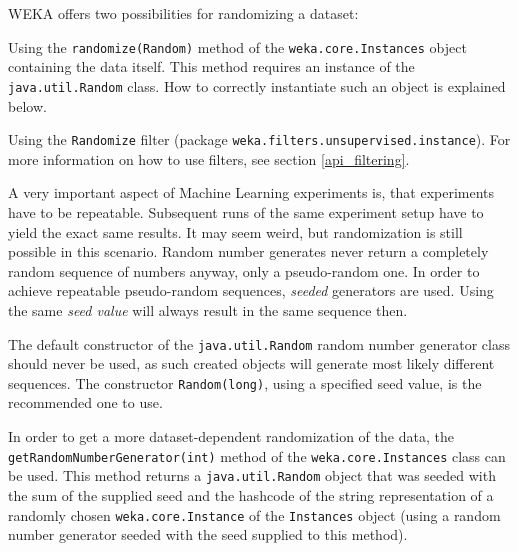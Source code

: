 WEKA offers two possibilities for randomizing a dataset:
\begin{tight_itemize}
	\item Using the \texttt{randomize(Random)} method of the
\texttt{weka.core.Instances} object containing the data itself. This method
requires an instance of the \texttt{java.util.Random} class. How to correctly
instantiate such an object is explained below.
	\item Using the \texttt{Randomize} filter (package
\texttt{weka.filters.unsupervised.instance}). For more information on how to
use filters, see section \ref{api_filtering}.
\end{tight_itemize}
A very important aspect of Machine Learning experiments is, that experiments
have to be repeatable. Subsequent runs of the same experiment setup have to
yield the exact same results. It may seem weird, but randomization is still
possible in this scenario. Random number generates never return a completely
random sequence of numbers anyway, only a pseudo-random one. In order to
achieve repeatable pseudo-random sequences, \textit{seeded} generators are
used. Using the same \textit{seed value} will always result in the same
sequence then.

The default constructor of the \texttt{java.util.Random} random number generator
class should never be used, as such created objects will generate most likely
different sequences. The constructor \texttt{Random(long)}, using a specified 
seed value, is the recommended one to use.

In order to get a more dataset-dependent randomization of the data, the
\texttt{getRandomNumberGenerator(int)} method of the
\texttt{weka.core.Instances} class can be used. This method returns a
\texttt{java.util.Random} object that was seeded with the sum of the supplied
seed and the hashcode of the string representation of a randomly chosen
\texttt{weka.core.Instance} of the \texttt{Instances} object (using a random
number generator seeded with the seed supplied to this method).

\newpage

